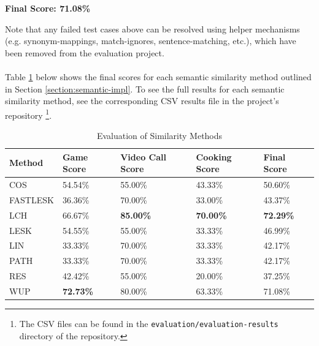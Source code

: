\documentclass[11pt]{article}
\begin{document}
\begin{center}
\textbf{Final Score: 71.08\%}
\end{center}

Note that any failed test cases above can be resolved using helper mechanisms (e.g. synonym-mappings, match-ignores, sentence-matching, etc.), which have been removed from the evaluation project.
\\
\\
Table \ref{table:method-results} below shows the final scores for each semantic similarity method outlined in Section \ref{section:semantic-impl}. To see the full results for each semantic similarity method, see the corresponding CSV results file in the project's repository \footnote{The CSV files can be found in the \texttt{evaluation/evaluation-results} directory of the repository.}.

\begin{table}[H]
\centering
\caption{Evaluation of Similarity Methods}
\label{table:method-results}
\begin{tabular}{l|l|l|l|l}
\textbf{Method} & \textbf{Game Score} & \textbf{Video Call Score} & \textbf{Cooking Score} & \textbf{Final Score} \\ \hline
COS             & 54.54\%             & 55.00\%                     & 43.33\%                & 50.60\%              \\ \hline
FASTLESK        & 36.36\%             & 70.00\%                     & 33.00\%                & 43.37\%              \\ \hline
LCH             & 66.67\%             & \textbf{85.00\%}            & \textbf{70.00\%}       & \textbf{72.29\%}     \\ \hline
LESK            & 54.55\%             & 55.00\%                     & 33.33\%                & 46.99\%              \\ \hline
LIN             & 33.33\%             & 70.00\%                     & 33.33\%                & 42.17\%              \\ \hline
PATH            & 33.33\%             & 70.00\%                     & 33.33\%                & 42.17\%              \\ \hline
RES             & 42.42\%             & 55.00\%                     & 20.00\%                & 37.25\%              \\ \hline
WUP             & \textbf{72.73\%}    & 80.00\%                     & 63.33\%                & 71.08\%               
\end{tabular}
\end{table}
\end{document}
